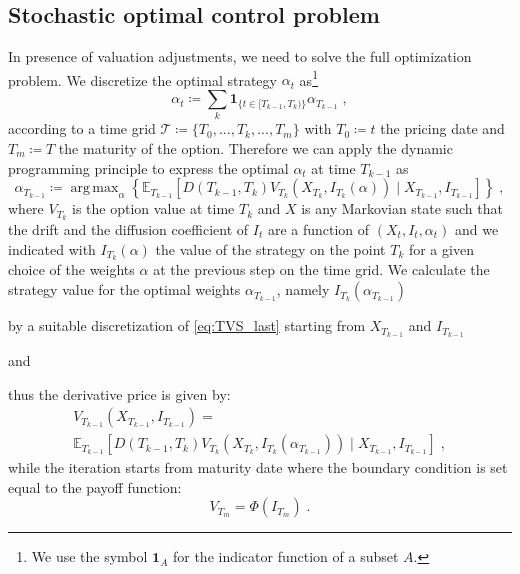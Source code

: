 \documentclass[runningheads]{m2ef}
\DeclareMathOperator*{\argmax}{arg\,max}
\newcommand\soutpars[1]{\let\helpcmd\sout\parhelp#1\par\relax\relax}
\newcommand{\change}[1]{{\color{red} {#1}}}%
\newcommand{\changeE}[1]{{\color{purple} {#1}}}%
\newcommand{\removeE}[1]{{\color{purple} \soutpars{{#1}}}}%
\begin{document}
\subsection{Stochastic \change{o}ptimal \change{c}ontrol \change{p}roblem}
In presence of valuation adjustments, we need to solve the full optimization problem. We discretize the optimal strategy $\alpha_t$ as\footnote{We use the symbol $\mathbf{1}_A$ for the indicator function of a subset $A$.}
\begin{equation}
    \alpha_t \coloneqq \sum_k \mathbf{1}_{ \{t \in [T_{k-1}, T_k)\}}\alpha_{T_{k-1}} \; ,
\label{eq:piecewise_strategy}\end{equation}
according to a time grid $\mathcal{T}\coloneqq \{T_0,...,T_k,...,T_m\}$ with $T_0\coloneqq t$ the pricing date and $T_m \coloneqq T$ the maturity of the option. 
Therefore we can apply the dynamic programming principle to express the optimal $\alpha_t$ at time $T_{k-1}$ as
\begin{equation}
    \alpha_{T_{k-1}}\coloneqq \argmax_{\alpha} \left\{\mathbb{E}_{T_{k-1}}\left[D\left(T_{k-1},T_{k} \right) V_{T_{k}}\left(X_{T_{k}}, I_{T_{k}}(\alpha)\right) \mid X_{T_{k-1}}, I_{T_{k-1}}\right]\right\} \; ,
\label{eq:recursion}\end{equation}
where $V_{T_k}$ is the option value at time $T_k$ and $X$ is any Markovian state such that the drift and the diffusion coefficient of $I_t$ are a function of $\left(X_t,I_t,\alpha_t\right)$ \changeE{and we indicated with $I_{T_k}\left(\alpha\right)$ the value of the strategy on the point $T_{k}$ for a given choice of the weights $\alpha$ at the previous step on the time grid.} We calculate \changeE{the strategy value for the optimal weights $\alpha_{T_{k-1}}$, namely} $I_{T_k}\left(\alpha_{T_{k-1}}\right)$ \removeE{for any given strategy $\alpha_{T_{k-1}}$} by a suitable discretization of \eqref{eq:TVS_last} starting from $X_{T_{k-1}}$ and $I_{T_{k-1}}$\removeE{.} \changeE{and}
\removeE{Thus} \changeE{thus} the derivative price is given by:
\begin{equation}
\begin{aligned}
	    V_{T_{k-1}}\left(X_{T_{k-1}}, I_{T_{k-1}}\right)= \\ 
	     \mathbb{E}_{T_{k-1}}\left[D\left(T_{k-1},T_{k}\right) V_{T_{k}}\left(X_{T_{k}}, I_{T_{k}}\left(\alpha_{T_{k-1}}\right)\right) \mid X_{T_{k-1}}, I_{T_{k-1}}\right] \; ,
\end{aligned}
\label{eq:recursion2}\end{equation}
while the iteration starts from maturity date where the boundary condition is set equal to the payoff function:
\begin{equation}
    V_{T_m} = \Phi\left(I_{T_m}\right) \; .
\end{equation}
\end{document}
